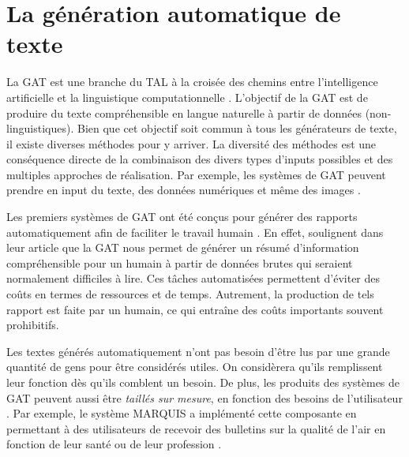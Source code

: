 
\chapter{La génération automatique de texte}


La \acf{GAT} est une branche du \acf{TAL} à la croisée des chemins entre l'intelligence artificielle et la linguistique computationnelle \citep{ReiterBuildingNaturalLanguage2000}. L'objectif de la \ac{GAT} est de produire du texte compréhensible en langue naturelle à partir de données (non-linguistiques). Bien que cet objectif soit commun à tous les générateurs de texte, il existe diverses méthodes pour y arriver. La diversité des méthodes est une conséquence directe de la combinaison des divers types d'inputs possibles et des multiples approches de réalisation. Par exemple, les systèmes de \ac{GAT} peuvent prendre en input du texte, des données numériques et même des images \citep{thomason:coling14}.

Les premiers systèmes de \ac{GAT} ont été conçus pour générer des rapports automatiquement afin de faciliter le travail humain \citep{ReiterBuildingNaturalLanguage2000}. En effet, \cite{DaoustJSREALTextRealizer2015} soulignent dans leur article que la \ac{GAT} nous permet de générer un résumé d'information compréhensible pour un humain à partir de données brutes qui seraient normalement difficiles à lire. Ces tâches automatisées permettent d'éviter des coûts en termes de ressources et de temps. Autrement, la production de tels rapport est faite par un humain, ce qui entraîne des coûts importants souvent prohibitifs.

Les textes générés automatiquement n'ont pas besoin d'être lus par une grande quantité de gens pour être considérés utiles. On considèrera qu'ils remplissent leur fonction dès qu'ils comblent un besoin. De plus, les produits des systèmes de \ac{GAT} peuvent aussi être \emph{taillés sur mesure}, en fonction des besoins de l'utilisateur \citep{1948c0b7a8ca42679cad977bb2cdddc2}. Par exemple, le système MARQUIS a implémenté cette composante en permettant à des utilisateurs de recevoir des bulletins sur la qualité de l'air en fonction de leur santé ou de leur profession \citep{WannerMARQUISGENERATIONUSERTAILORED2010}.

